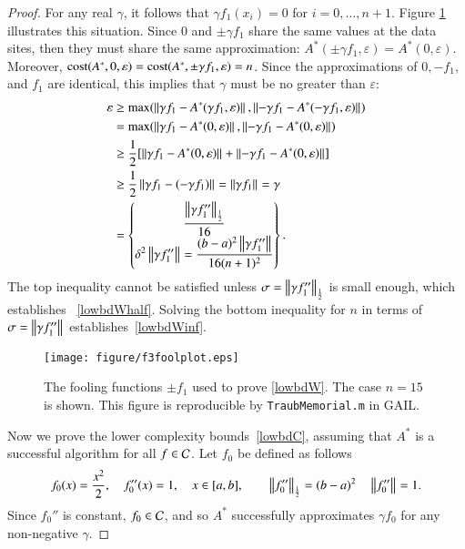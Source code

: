 \documentclass[review]{elsarticle}
\newcommand{\abstol}{\varepsilon}
\theoremstyle{definition}
\begin{document}
\begin{proof}
	For any real $\gamma$, it follows that $\gamma f_1(x_i)=0$ for $i=0, \ldots,
	n+1$. Figure \ref{f3foolplot} illustrates this situation. Since $0$ and $\pm
	\gamma f_1$ share the same values at the data sites, then they must share the
	same approximation: $A^*(\pm \gamma f_1,\abstol) = A^*(0,\abstol)$. Moreover,
	$\cost(A^*,0,\abstol) = \cost(A^*,\pm \gamma f_1,\abstol) = n$. Since the
	approximations of $0, -f_1$, and $f_1$ are identical, this implies that $\gamma$
	must be no greater than $\abstol$:
	\begin{align*}
	\abstol  &\ge \max(\norm{\gamma f_1 - A^*(\gamma f_1,\abstol)}, \norm{-\gamma f_1 - A^*(-\gamma f_1,\abstol)}) \\
	&= \max(\norm{\gamma f_1 - A^*(0,\abstol)}, \norm{-\gamma f_1 - A^*(0,\abstol)}) \\
	& \ge \frac{1}{2} [\norm{\gamma f_1 - A^*(0,\abstol)} + \norm{-\gamma f_1 - A^*(0,\abstol)}] \\
	& \ge \frac{1}{2} \norm{\gamma f_1 - (-\gamma f_1)} =  \norm{\gamma f_1} = \gamma \\
	& = \begin{Bmatrix} \displaystyle \frac{ \norm[\frac 12]{\gamma f_1''}}{16}  \\
	\displaystyle \delta^2 	\norm{\gamma f_1''} =  \frac{(b-a)^2 \norm{\gamma f_1''}}{16(n+1)^2}
	\end{Bmatrix}.
	\end{align*}
	The top inequality cannot be satisfied unless $\sigma = \norm[\frac 12]{\gamma
	f_1''}$ is small enough, which establishes ~\eqref{lowbdWhalf}. Solving the
	bottom inequality for $n$ in terms of $\sigma = \norm{\gamma f_1''}$
	establishes~\eqref{lowbdWinf}.
		
	\begin{figure}
		\centering
		\texttt{[image: figure/f3foolplot.eps]}
		\caption{The fooling functions $\pm f_1$ used to prove \eqref{lowbdW}. The case
		$n=15$ is shown.  This figure is reproducible by \texttt{TraubMemorial.m}
		in GAIL.}
		\label{f3foolplot}
	\end{figure}
	
	Now we prove the lower complexity bounds~\eqref{lowbdC}, assuming that $A^*$ is
	a successful algorithm for all $f \in \cc$. Let $f_0$ be defined as follows
	\begin{equation}
	\label{assumpfzero}
	f_0(x) =\frac{x^2}{2}, \quad f_0''(x) = 1, \quad x \in [a,b], \qquad \norm[\frac12]{f_0''} = (b -a)^2  \quad \norm{f_0''} = 1.
	\end{equation}
	Since $f_0''$ is constant, $f_0 \in \cc$, and so $A^*$ successfully approximates
	$\gamma f_0$ for any non-negative $\gamma$.
	

\end{proof}
\end{document}
